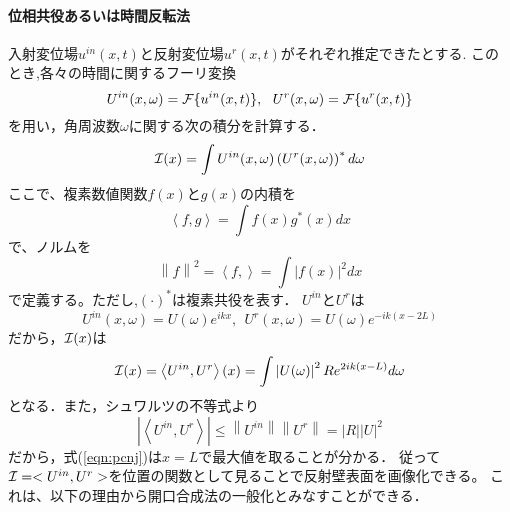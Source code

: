 \documentclass[10pt,a4j,dvipdfmx]{jarticle}
\begin{document}
\paragraph{位相共役あるいは時間反転法}
入射変位場$u^{in}(x,t)$と反射変位場$u^{r}(x,t)$がそれぞれ推定できたとする.
このとき,各々の時間に関するフーリ変換
\begin{equation}
	U^{in}(x,\omega)={\cal F} \{ u^{in}(x,t)\}, \ \ 
	U^{r}(x,\omega)={\cal F} \{ u^{r}(x,t)\}
	\label{eqn:}
\end{equation}
を用い，角周波数$\omega$に関する次の積分を計算する．
\begin{equation}
	{\cal I }(x)=
	\int 	
	U^{in}(x,\omega)\left( U^{r}(x,\omega)\right)^* d\omega
	\label{eqn:}
\end{equation}
ここで、複素数値関数$f(x)$と$g(x)$の内積を
\begin{equation}
	\left< f,g\right>=\int f(x)g^*(x)dx
	\label{eqn:}
\end{equation}
で、ノルムを
\begin{equation}
	\left\| f \right\|^2=\left<f,\right> =\int |f(x)|^2dx
	\label{eqn:}
\end{equation}
で定義する。ただし,$(\cdot)^*$は複素共役を表す．
$U^{in}$と$U^{r}$は
\begin{equation}
	U^{in}(x,\omega)=U(\omega)e^{ikx}, \ \ 
	U^{r}(x,\omega)=U(\omega)e^{-ik(x-2L)}
	\label{eqn:}
\end{equation}
だから，${\cal I}(x)$は
\begin{equation}
	{\cal I}(x)
	=
	\left< U^{in},U^{r}\right>(x)
	=
	\int 
	\left| U(\omega) \right|^2 
	R
	e^{2ik(x-L)}d\omega
	\label{eqn:pcnj}
\end{equation}
となる．また，シュワルツの不等式より
\begin{equation}
	\left| \left< U^{in},U^{r} \right> \right|
	\leq  \left\| U^{in}\right\| \left\| U^{r}\right\|
	=\left| R \right|
	\left| U\right|^2
	\label{eqn:}
\end{equation}
だから，式(\ref{eqn:pcnj})は$x=L$で最大値を取ることが分かる．
従って${\cal I}=<U^{in},U^{r}>$を位置の関数として見ることで反射壁表面を画像化できる。
これは、以下の理由から開口合成法の一般化とみなすことができる．
\end{document}
